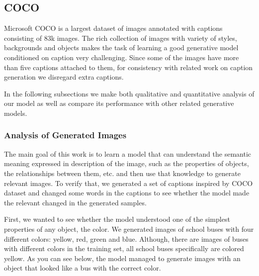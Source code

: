 \documentclass{article} %
\begin{document}
\subsection{COCO}

Microsoft COCO \citep{mscoco} is a largest dataset of images annotated with captions consisting of 83k images. The rich collection of images with variety of styles, backgrounds and objects makes the task of learning a good generative model conditioned on caption very challenging. Since some of the images have more than five captions attached to them, for consistency with related work on caption generation we disregard extra captions.

In the following subsections we make both qualitative and quantitative analysis of our model as well as compare its performance with other related generative models.

\subsubsection{Analysis of Generated Images}
The main goal of this work is to learn a model that can understand the semantic meaning expressed in description of the image, such as the properties of objects, the relationships between them, etc. and then use that knowledge to generate relevant images. To verify that, we generated a set of captions inspired by COCO dataset and changed some words in the captions to see whether the model made the relevant changed in the generated samples.

First, we wanted to see whether the model understood one of the simplest properties of any object, the color. We generated images of school buses with four different colors: yellow, red, green and blue. Although, there are images of buses with different colors in the training set, all school buses specifically are colored yellow. As you can see below, the model managed to generate images with an object that looked like a bus with the correct color.
\end{document}
